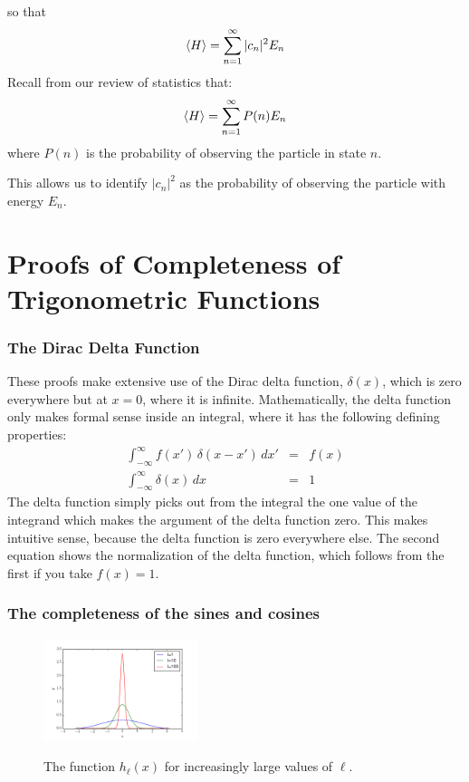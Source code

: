 \documentclass[12pt]{book}
\begin{document}
so that  
\begin{equation}  
\braket{H} = \sum_{n=1}^{\infty} |c_n|^2 E_n
\end{equation}
Recall from our review of statistics that:
\begin{equation}  
\braket{H} = \sum_{n=1}^{\infty} P(n) E_n
\end{equation}
where $P(n)$ is the probability of observing the particle in state $n$.

This allows us to identify $|c_n|^2$ as the probability of observing the particle with energy $E_n$.


\appendix

\chapter{Proofs of Completeness of Trigonometric Functions}


\subsection{The Dirac Delta Function}

These proofs make extensive use of the Dirac delta function, $\delta(x)$, which is zero everywhere but at $x=0$, where it is infinite.  Mathematically, the delta function only makes formal sense inside an integral, where it has the following defining properties:
\begin{eqnarray}
\int_{-\infty}^{\infty} f(x') \, \delta(x-x') \, dx' &=& f(x) \\
\int_{-\infty}^{\infty} \delta(x) \, dx &=& 1 \label{eqn:norm}
 \end{eqnarray}
The delta function simply picks out from the integral the one value of the integrand which makes the argument of the delta function zero.  This makes intuitive sense, because the delta function is zero everywhere else.  The second equation shows the normalization of the delta function, which follows from the first if you take $f(x)=1$.





\subsection{The completeness of the sines and cosines}

\begin{figure}[thb]
\begin{center}
{\includegraphics[width=0.40\textwidth]{figs/hk.png}}
\end{center}
\caption{\label{fig:hl} The function $h_\ell(x)$ for increasingly large values of $\ell$.}
\end{figure}
\end{document}
